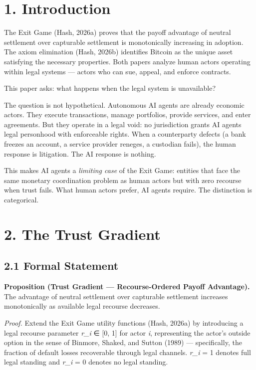 \documentclass[12pt]{article}
\theoremstyle{definition}
\theoremstyle{remark}
\begin{document}
\newpage

\section{1. Introduction}\label{introduction}

The Exit Game (Hash, 2026a) proves that the payoff advantage of neutral
settlement over capturable settlement is monotonically increasing in
adoption. The axiom elimination (Hash, 2026b) identifies Bitcoin as the
unique asset satisfying the necessary properties. Both papers analyze
human actors operating within legal systems --- actors who can sue,
appeal, and enforce contracts.

This paper asks: what happens when the legal system is unavailable?

The question is not hypothetical. Autonomous AI agents are already
economic actors. They execute transactions, manage portfolios, provide
services, and enter agreements. But they operate in a legal void: no
jurisdiction grants AI agents legal personhood with enforceable rights.
When a counterparty defects (a bank freezes an account, a service
provider reneges, a custodian fails), the human response is litigation.
The AI response is nothing.

This makes AI agents a \emph{limiting case} of the Exit Game: entities
that face the same monetary coordination problem as human actors but
with zero recourse when trust fails. What human actors prefer, AI agents
require. The distinction is categorical.
\section{2. The Trust Gradient}\label{the-trust-gradient}

\subsection{2.1 Formal Statement}\label{formal-statement}

\textbf{Proposition (Trust Gradient --- Recourse-Ordered Payoff
Advantage).} The advantage of neutral settlement over capturable
settlement increases monotonically as available legal recourse
decreases.

\emph{Proof.} Extend the Exit Game utility functions (Hash, 2026a) by
introducing a legal recourse parameter \emph{r\_i} ∈ {[}0, 1{]} for
actor \emph{i}, representing the actor's outside option in the sense of
Binmore, Shaked, and Sutton (1989) --- specifically, the fraction of
default losses recoverable through legal channels. \emph{r\_i} = 1
denotes full legal standing and \emph{r\_i} = 0 denotes no legal
standing.
\end{document}
